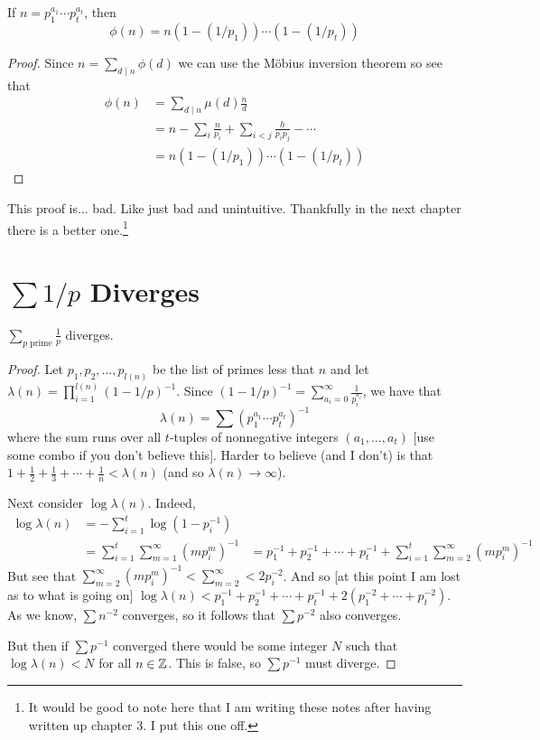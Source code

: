 \begin{prop}
  If \(n=p_1^{a_{1}}\cdots p_t^{a_t}\), then
  \[
    \phi(n) = n(1-(1 /p_1))\cdots(1-(1 /p_t))
  \]
\end{prop}

\begin{proof}
  Since \(n=\sum_{d\mid n}\phi(d)\) we can use the M\"obius inversion theorem so
  see that
  \begin{align*}
    \phi(n) &= \sum_{d\mid n}\mu(d) \frac{n}{d} \\
         &= n - \sum_i \frac{n}{p_i} + \sum_{i<j} \frac{h}{p_i p_j } - \cdots \\
         &=  n(1-(1 /p_1))\cdots(1-(1 /p_t))
  \end{align*}
\end{proof}

This proof is\(\dots\) bad. Like just bad and unintuitive. Thankfully in the next
chapter there is a better one.\footnote{It would be good to note here that I am
  writing these notes after having written up chapter 3. I put this one off.}

\section{\(\sum 1 / p\) Diverges}%
\label{sec:1pdiv}

\begin{theorem}
  \(\sum_{p \text{ prime}} \frac{1}{p}\) diverges.
\end{theorem}

\begin{proof}
  Let \(p_1, p_2, \dots , p_{l(n)}\) be the list of primes less that \(n\) and
  let \(\lambda(n)= \prod_{i=1}^{l(n)} {(1- 1 /p)}^{-1}\). Since
  \({(1- 1 /p)}^{-1}=\sum_{a_i=0}^{\infty} \frac{1}{p_i^{a_i}}\), we have that
  \[
    \lambda(n) = \sum (p_1^{a_{1}}\cdots p_t^{a_t}) ^{-1}
  \]
  where the sum runs over all \(t\)-tuples of nonnegative integers
  \((a_1, \dots, a_t)\) [use some combo if you don't believe this]. Harder to
  believe (and I don't) is that
  \(1+\frac{1}{2}+ \frac{1}{3}+ \cdots + \frac{1}{n} < \lambda(n)\) (and so \(\lambda(n)\to \infty\)).

  Next consider \(\log \lambda(n)\). Indeed,
  \begin{align*}
    \log \lambda(n) &= - \sum_{i=1}^t \log (1-p_i ^{-1})\\
              &= \sum_{i=1}^t \sum_{m=1}^{\infty} {(m p_i^m)} ^{-1}
              &=  p_1 ^{-1}+p_2 ^{-1} + \cdots + p_t ^{-1} +  \sum_{i=1}^t \sum_{m=2}^{\infty} {(m p_i^m)} ^{-1}
  \end{align*}
  But see that
  \(\sum_{m=2}^{\infty} {(m p_i^m)}^{-1}< \sum_{m=2}^{\infty} < 2p_i ^{-2}\).
  And so [at this point I am lost as to what is going on]
  \(\log \lambda(n) < p_1 ^{-1} + p_2 ^{-1} + \cdots + p_t ^{-1} + 2(p_1 ^{-2}+\cdots+p_t ^{-2})\).
  As we know, \(\sum n^{-2}\) converges, so it follows that \(\sum p^{-2}\) also
  converges.

  But then if \(\sum p ^{-1}\) converged there would be some integer \(N\) such
  that \(\log \lambda(n)<N\) for all \(n \in \mathbb{Z} \). This is false, so
  \(\sum p ^{-1}\) must diverge.
\end{proof}

